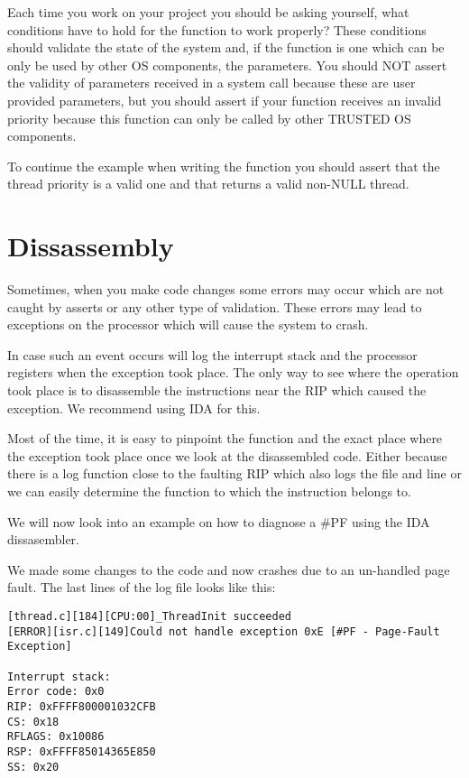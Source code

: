 \begin{appendices}
Each time you work on your project you should be asking yourself, what conditions have to hold for
the function to work properly? These conditions should validate the state of the system and, if the
function is one which can be only be used by other OS components, the parameters. You should NOT
assert the validity of parameters received in a system call because these are user provided
parameters, but you should assert if your  function receives an invalid
priority because this function can only be called by other TRUSTED OS components.

To continue the example when writing the  function you should assert that
the thread priority is a valid one and that  returns a valid non-NULL thread.

\section{Dissassembly}

Sometimes, when you make code changes some errors may occur which are not caught by asserts or any
other type of validation. These errors may lead to exceptions on the processor which will cause the
system to crash.

In case such an event occurs \projectname will log the interrupt stack and the processor registers
when the exception took place. The only way to see where the operation took place is to disassemble
the instructions near the RIP which caused the exception. We recommend using IDA \cite{ida} for this.

Most of the time, it is easy to pinpoint the function and the exact place where the exception took
place once we look at the disassembled code. Either because there is a log function close to the
faulting RIP which also logs the file and line or we can easily determine the function to which the
instruction belongs to.

We will now look into an example on how to diagnose a \#PF using the IDA dissasembler.

We made some changes to the code and now \projectname crashes due to an un-handled page fault. The
last lines of the log file looks like this:
\begin{verbatim}
[thread.c][184][CPU:00]_ThreadInit succeeded
[ERROR][isr.c][149]Could not handle exception 0xE [#PF - Page-Fault Exception]

Interrupt stack:
Error code: 0x0
RIP: 0xFFFF800001032CFB
CS: 0x18
RFLAGS: 0x10086
RSP: 0xFFFF85014365E850
SS: 0x20


\end{verbatim}
\end{appendices}
